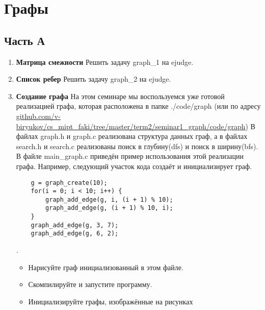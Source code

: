 \documentclass[12pt]{article}
\begin{document}

\section*{Графы}
\subsection*{Часть А}

\begin{enumerate}
\item \textbf{Матрица смежности} Решить задачу graph\_1 на ejudge.
\item \textbf{Список ребер} Решить задачу graph\_2 на ejudge.
\item \textbf{Создание графа} На этом семинаре мы воспользуемся уже готовой реализацией графа, которая расположена в папке ./code/graph (или по адресу \\ \href{github.com/v-biryukov/cs_mipt_faki/tree/master/term2/seminar1_graph/code/graph}{github.com/v-biryukov/cs\_mipt\_faki/tree/master/term2/seminar1\_graph/code/graph})
В файлах graph.h и graph.c реализована структура данных граф, а в файлах search.h и search.c реализованы поиск в глубину(dfs) и поиск в ширину(bfs).
В файле main\_graph.c приведён пример использования этой реализации графа. Например, следующий участок кода создаёт и инициализирует граф.
\begin{verbatim}
    g = graph_create(10);
    for(i = 0; i < 10; i++) {
        graph_add_edge(g, i, (i + 1) % 10);
        graph_add_edge(g, (i + 1) % 10, i);
    }
    graph_add_edge(g, 3, 7);
    graph_add_edge(g, 6, 2);
\end{verbatim}.
\begin{itemize}
\item Нарисуйте граф инициализованный в этом файле.
\item Скомпилируйте и запустите программу.
\item Инициализируйте графы, изображённые на рисунках


\end{itemize}


\end{enumerate}
\end{document}
